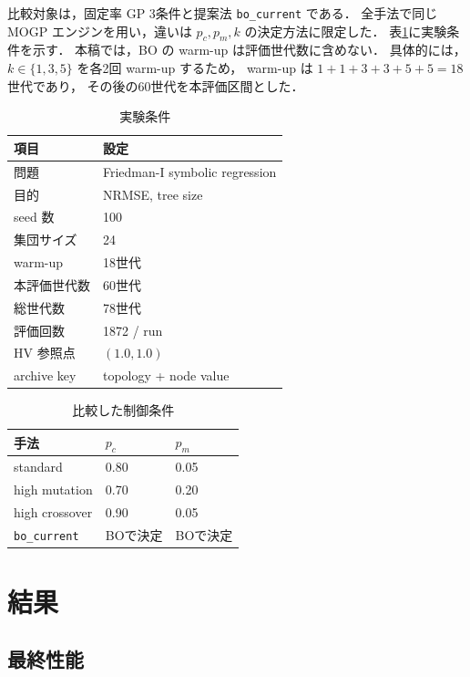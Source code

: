 \documentclass[a4paper,10pt,twocolumn]{ltjsarticle}
\begin{document}
比較対象は，固定率 GP 3条件と提案法 \texttt{bo\_current} である．
全手法で同じ MOGP エンジンを用い，違いは \(p_c,p_m,k\) の決定方法に限定した．
表\ref{tab:setting}に実験条件を示す．
本稿では，BO の warm-up は評価世代数に含めない．
具体的には，\(k\in\{1,3,5\}\) を各2回 warm-up するため，
warm-up は \(1+1+3+3+5+5=18\) 世代であり，
その後の60世代を本評価区間とした．

\begin{table}[tb]
\centering
\caption{実験条件}
\label{tab:setting}
\small
\begin{tabular}{@{}ll@{}}
\toprule
項目 & 設定 \\
\midrule
問題 & Friedman-I symbolic regression \\
目的 & NRMSE, tree size \\
seed 数 & 100 \\
集団サイズ & 24 \\
warm-up & 18世代 \\
本評価世代数 & 60世代 \\
総世代数 & 78世代 \\
評価回数 & 1872 / run \\
HV 参照点 & \((1.0,1.0)\) \\
archive key & topology + node value \\
\bottomrule
\end{tabular}
\end{table}

\begin{table}[tb]
\centering
\caption{比較した制御条件}
\label{tab:methods}
\small
\begin{tabular}{@{}lll@{}}
\toprule
手法 & \(p_c\) & \(p_m\) \\
\midrule
standard & 0.80 & 0.05 \\
high mutation & 0.70 & 0.20 \\
high crossover & 0.90 & 0.05 \\
\texttt{bo\_current} & BOで決定 & BOで決定 \\
\bottomrule
\end{tabular}
\end{table}

\section{結果}

\subsection{最終性能}
\end{document}
